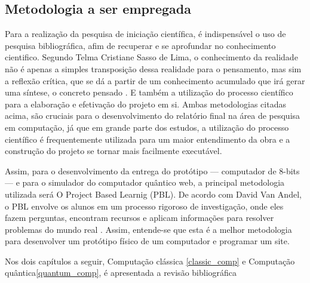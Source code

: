 \subsection{Metodologia a ser empregada}
Para a realização da pesquisa de iniciação científica, é indispensável o uso de pesquisa bibliográfica, afim de recuperar e se aprofundar no conhecimento cientifico. Segundo Telma Cristiane Sasso de Lima, o conhecimento da realidade não é apenas a simples transposição dessa realidade para o pensamento, mas sim a reflexão crítica, que se dá a partir de um conhecimento acumulado que irá gerar uma síntese, o concreto pensado \cite{1}. E também a utilização do processo científico para a elaboração e efetivação do projeto em si. Ambas metodologias citadas acima, são cruciais para o desenvolvimento do relatório final na área de pesquisa em computação, já que em grande parte dos estudos, a utilização do processo científico é frequentemente utilizada para um maior entendimento da obra e a construção do projeto se tornar mais facilmente executável.

Assim, para o desenvolvimento da entrega do protótipo — computador de 8-bits — e para o simulador do computador quântico web, a principal metodologia utilizada será O Project Based Learnig (PBL). De acordo com David Van Andel, o PBL envolve os alunos em um processo rigoroso de investigação, onde eles fazem perguntas, encontram recursos e aplicam informações para resolver problemas do mundo real \cite{3}. Assim, entende-se que esta é a melhor metodologia para desenvolver um protótipo físico de um computador e programar um site.

Nos dois capítulos a seguir, Computação clássica \ref{classic_comp} e Computação quântica\ref{quantum_comp}, é apresentada a revisão bibliográfica 
\newpage


